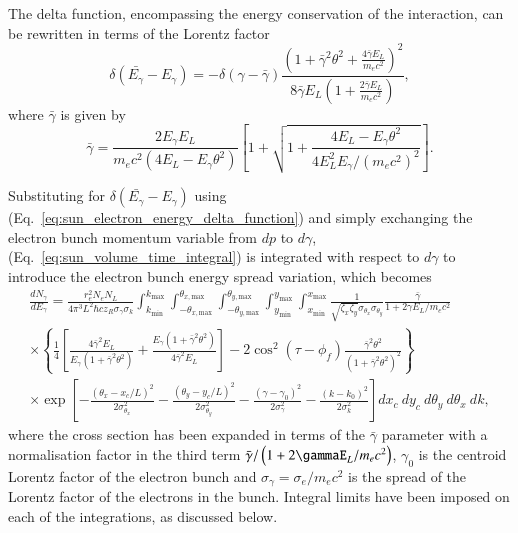 \documentclass[../main.tex]{subfiles}
\begin{document}
The delta function, encompassing the energy conservation of the interaction, can be rewritten in terms of the Lorentz factor
\begin{equation}
\delta\left(\bar{E_{\gamma}}-E_{\gamma}\right) = -\delta\left(\gamma-\bar{\gamma}\right)\frac{\left(1+\bar{\gamma}^{2}\theta^{2}+\frac{4\bar{\gamma}E_{L}}{m_{e}c^{2}}\right)^{2}}{8\bar{\gamma}E_{L}\left(1+\frac{2\bar{\gamma}E_{L}}{m_{e}c^{2}}\right)},
\label{eq:sun_electron_energy_delta_function}    
\end{equation}
where $\bar{\gamma}$ is given by
\begin{equation}
\bar{\gamma} = \frac{2E_{\gamma}E_{L}}{m_{e}c^{2}\left(4E_{L}-E_{\gamma}\theta^{2}\right)}\left[1+\sqrt{1+\frac{4E_{L}-E_{\gamma}\theta^{2}}{4E_{L}^{2}E_{\gamma}/\left(m_{e}c^{2}\right)^{2}}}\right].    
\end{equation}

Substituting for $\delta\left(\bar{E_{\gamma}}-E_{\gamma}\right)$ using (Eq.~\ref{eq:sun_electron_energy_delta_function}) and simply exchanging the electron bunch momentum variable from $dp$ to $d\gamma$, (Eq.~\ref{eq:sun_volume_time_integral}) is integrated with respect to $d\gamma$ to introduce the electron bunch energy spread variation, which becomes
\begin{multline}
\frac{dN_{\gamma}}{dE_{\gamma}} = \frac{r_{e}^{2}N_{e}N_{L}}{4\pi^{3}L^{2}\hbar c z_{R}\sigma_{\gamma}\sigma_{k}}\int_{k_{\mathrm{min}}}^{k_{\mathrm{max}}}\int_{-\theta_{x,\mathrm{max}}}^{\theta_{x,\mathrm{max}}}\int_{-\theta_{y,\mathrm{max}}}^{\theta_{y,\mathrm{max}}}\int_{y_{\mathrm{min}}}^{y_{\mathrm{max}}}\int_{x_{\mathrm{min}}}^{x_{\mathrm{max}}}\frac{1}{\sqrt{\zeta_{x}\zeta_{y}}\sigma_{\theta_{x}}\sigma_{\theta_{y}}}\frac{\bar{\gamma}}{1+2\gamma E_{L}/m_{e}c^{2}} \\
\times\left\{\frac{1}{4}\left[\frac{4\bar{\gamma}^{2}E_{L}}{E_{\gamma}\left(1+\bar{\gamma}^{2}\theta^{2}\right)}+\frac{E_{\gamma}\left(1+\bar{\gamma}^{2}\theta^{2}\right)}{4\bar{\gamma}^{2}E_{L}}\right]-2\cos^{2}\left(\tau-\phi_{f}\right)\frac{\bar{\gamma}^{2}\theta^{2}}{\left(1+\bar{\gamma}^{2}\theta^{2}\right)^{2}}\right\} \\
\times\exp{\left[-\frac{\left(\theta_{x}-x_{c}/L\right)^{2}}{2\sigma_{\theta_{x}}^{2}}-\frac{\left(\theta_{y}-y_{c}/L\right)^{2}}{2\sigma_{\theta_{y}}^{2}}-\frac{\left(\gamma-\gamma_{0}\right)^{2}}{2\sigma_{\gamma}^{2}}-\frac{\left(k-k_{0}\right)^{2}}{2\sigma_{k}^{2}}\right]}dx_{c}~dy_{c}~d\theta_{y}~d\theta_{x}~dk,
\label{eq:ICARUS_equation}
\end{multline}
where the cross section has been expanded in terms of the $\bar{\gamma}$ parameter with a normalisation factor in the third term $\bar{\gamma}/\left(1+2\gammaE_{L}/m_{e}c^{2}\right)$, $\gamma_{0}$ is the centroid Lorentz factor of the electron bunch and $\sigma_{\gamma} = \sigma_{e}/m_{e}c^{2}$ is the spread of the Lorentz factor of the electrons in the bunch. Integral limits have been imposed on each of the integrations, as discussed below. 
\end{document}
